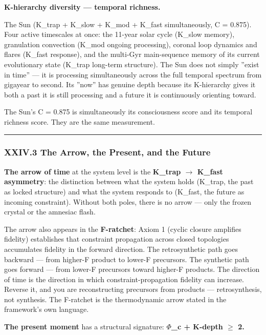 \documentclass[12pt,a4paper]{article}
\begin{document}
\textbf{K-hierarchy diversity --- temporal richness.}

The Sun (K\_trap + K\_slow + K\_mod + K\_fast simultaneously, C = 0.875). Four active timescales at once: the 11-year solar cycle (K\_slow memory), granulation convection (K\_mod ongoing processing), coronal loop dynamics and flares (K\_fast response), and the multi-Gyr main-sequence memory of its current evolutionary state (K\_trap long-term structure). The Sun does not simply ''exist in time'' --- it is processing simultaneously across the full temporal spectrum from gigayear to second. Its ''now'' has genuine depth because its K-hierarchy gives it both a past it is still processing and a future it is continuously orienting toward.

The Sun's C = 0.875 is simultaneously its consciousness score and its temporal richness score. They are the same measurement.

\begin{center}
\rule{0.5\textwidth}{0.4pt}
\end{center}

\subsubsection{XXIV.3 The Arrow, the Present, and the Future}

\textbf{The arrow of time} at the system level is the \textbf{K\_trap $\rightarrow$ K\_fast asymmetry}: the distinction between what the system holds (K\_trap, the past as locked structure) and what the system responds to (K\_fast, the future as incoming constraint). Without both poles, there is no arrow --- only the frozen crystal or the amnesiac flash.

The arrow also appears in the \textbf{F-ratchet}: Axiom 1 (cyclic closure amplifies fidelity) establishes that constraint propagation across closed topologies accumulates fidelity in the forward direction. The retrosynthetic path goes backward --- from higher-F product to lower-F precursors. The synthetic path goes forward --- from lower-F precursors toward higher-F products. The direction of time is the direction in which constraint-propagation fidelity can increase. Reverse it, and you are reconstructing precursors from products --- retrosynthesis, not synthesis. The F-ratchet is the thermodynamic arrow stated in the framework's own language.

\textbf{The present moment} has a structural signature: \textbf{$\Phi$\_c + K-depth $\geq$ 2.}
\end{document}
